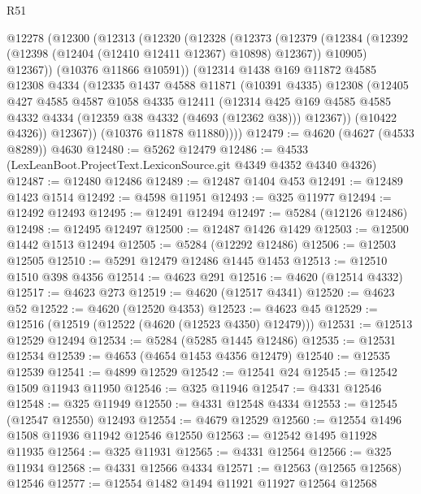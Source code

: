 \begin{lexlean}{R51}
\begin{coremodule}
    @12278
      (@12300
        (@12313
          (@12320
            (@12328
              (@12373
                (@12379
                  (@12384 (@12392 (@12398 (@12404 (@12410 @12411 @12367) @10898) @12367)) @10905)
                  @12367))
              (@10376 @11866 @10591))
            (@12314
              @1438
              @169
              @11872
              @4585
              @12308
              @4334
              (@12335
                @1437
                @4588
                @11871
                (@10391 @4335)
                @12308
                (@12405
                  @427
                  @4585
                  @4587
                  @1058
                  @4335
                  @12411
                  (@12314
                    @425
                    @169
                    @4585
                    @4585
                    @4332
                    @4334
                    (@12359 @38 @4332 (@4693 (@12362 @38)))
                    @12367))
                (@10422 @4326))
              @12367))
          (@10376 @11878 @11880))))
@12479 := @4620 (@4627 (@4533 @8289)) @4630
@12480 := @5262 @12479
@12486 := @4533 (LexLeanBoot.ProjectText.LexiconSource.git @4349 @4352 @4340 @4326)
@12487 := @12480 @12486
@12489 := @12487 @1404 @453
@12491 := @12489 @1423 @1514
@12492 := @4598 @11951
@12493 := @325 @11977
@12494 := @12492 @12493
@12495 := @12491 @12494
@12497 := @5284 (@12126 @12486)
@12498 := @12495 @12497
@12500 := @12487 @1426 @1429
@12503 := @12500 @1442 @1513 @12494
@12505 := @5284 (@12292 @12486)
@12506 := @12503 @12505
@12510 := @5291 @12479 @12486 @1445 @1453
@12513 := @12510 @1510 @398 @4356
@12514 := @4623 @291
@12516 := @4620 (@12514 @4332)
@12517 := @4623 @273
@12519 := @4620 (@12517 @4341)
@12520 := @4623 @52
@12522 := @4620 (@12520 @4353)
@12523 := @4623 @45
@12529 := @12516 (@12519 (@12522 (@4620 (@12523 @4350) @12479)))
@12531 := @12513 @12529 @12494
@12534 := @5284 (@5285 @1445 @12486)
@12535 := @12531 @12534
@12539 := @4653 (@4654 @1453 @4356 @12479)
@12540 := @12535 @12539
@12541 := @4899 @12529
@12542 := @12541 @24
@12545 := @12542 @1509 @11943 @11950
@12546 := @325 @11946
@12547 := @4331 @12546
@12548 := @325 @11949
@12550 := @4331 @12548 @4334
@12553 := @12545 (@12547 @12550) @12493
@12554 := @4679 @12529
@12560 := @12554 @1496 @1508 @11936 @11942 @12546 @12550
@12563 := @12542 @1495 @11928 @11935
@12564 := @325 @11931
@12565 := @4331 @12564
@12566 := @325 @11934
@12568 := @4331 @12566 @4334
@12571 := @12563 (@12565 @12568) @12546
@12577 := @12554 @1482 @1494 @11921 @11927 @12564 @12568

\end{coremodule}
\end{lexlean}
